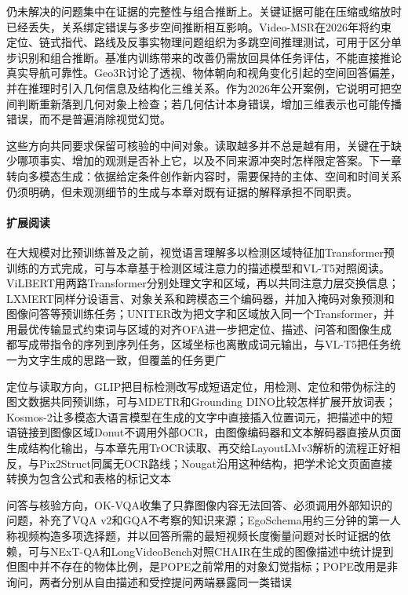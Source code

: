 仍未解决的问题集中在证据的完整性与组合推断上。关键证据可能在压缩或缩放时已经丢失，关系绑定错误与多步空间推断相互影响。Video-MSR在2026年将约束定位、链式指代、路线及反事实物理问题组织为多跳空间推理测试，可用于区分单步识别和组合推断。基准内训练带来的改善仍需放回具体任务评估，不能直接推论真实导航可靠性。Geo3R讨论了透视、物体朝向和视角变化引起的空间回答偏差，并在推理时引入几何信息及结构化三维关系。作为2026年公开案例，它说明可把空间判断重新落到几何对象上检查；若几何估计本身错误，增加三维表示也可能传播错误，而不是普遍消除视觉幻觉。

这些方向共同要求保留可核验的中间对象。读取越多并不总是越有用，关键在于缺少哪项事实、增加的观测是否补上它，以及不同来源冲突时怎样限定答案。下一章转向多模态生成：依据给定条件创作新内容时，需要保持的主体、空间和时间关系仍须明确，但未观测细节的生成与本章对既有证据的解释承担不同职责。

\paragraph{扩展阅读}
在大规模对比预训练普及之前，视觉语言理解多以检测区域特征加Transformer预训练的方式完成，可与本章基于检测区域注意力的描述模型和VL-T5对照阅读。ViLBERT用两路Transformer分别处理文字和区域，再以共同注意力层交换信息；LXMERT同样分设语言、对象关系和跨模态三个编码器，并加入掩码对象预测和图像问答等预训练任务；UNITER改为把文字和区域放入同一个Transformer，并用最优传输显式约束词与区域的对齐OFA进一步把定位、描述、问答和图像生成都写成带指令的序列到序列任务，区域坐标也离散成词元输出，与VL-T5把任务统一为文字生成的思路一致，但覆盖的任务更广

定位与读取方向，GLIP把目标检测改写成短语定位，用检测、定位和带伪标注的图文数据共同预训练，可与MDETR和Grounding DINO比较怎样扩展开放词表；Kosmos-2让多模态大语言模型在生成的文字中直接插入位置词元，把描述中的短语链接到图像区域Donut不调用外部OCR，由图像编码器和文本解码器直接从页面生成结构化输出，与本章先用TrOCR读取、再交给LayoutLMv3解析的流程正好相反，与Pix2Struct同属无OCR路线；Nougat沿用这种结构，把学术论文页面直接转换为包含公式和表格的标记文本

问答与核验方向，OK-VQA收集了只靠图像内容无法回答、必须调用外部知识的问题，补充了VQA v2和GQA不考察的知识来源；EgoSchema用约三分钟的第一人称视频构造多项选择题，并以回答所需的最短视频长度衡量问题对长时证据的依赖，可与NExT-QA和LongVideoBench对照CHAIR在生成的图像描述中统计提到但图中并不存在的物体比例，是POPE之前常用的对象幻觉指标；POPE改用是非询问，两者分别从自由描述和受控提问两端暴露同一类错误
